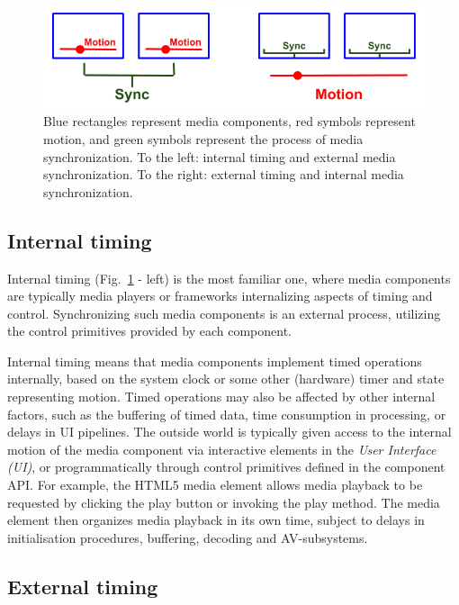 \documentclass[graybox]{svmult}
\begin{document}
\begin{figure}[h]
\centering
\includegraphics[scale=.4]{fig/internal-external.png}
\caption{
  Blue rectangles represent media components, red symbols represent motion, and green symbols represent the process of media synchronization. To the left: internal timing and external media synchronization. To the right: external timing and internal media synchronization.
}
\label{fig:internalexternal}
\end{figure}


\subsection{Internal timing}

Internal timing (Fig.~\ref{fig:internalexternal} - left) is the most
familiar one, where media components are typically media players or frameworks
internalizing aspects of timing and control. Synchronizing such media
components is an external process, utilizing the control primitives provided
by each component.

Internal timing means that media components implement timed operations
internally, based on the system clock or some other (hardware) timer and state
representing motion. Timed operations may also be affected by other internal
factors, such as the buffering of timed data, time consumption in processing,
or delays in UI pipelines. The outside world is typically given access to the
internal motion of the media component via interactive elements in the \emph{User Interface (UI)}, or
programmatically through control primitives defined in the component API. For
example, the HTML5 media element allows media playback to be requested by
clicking the play button or invoking the play method. The media element then
organizes media playback in its own time, subject to delays in initialisation
procedures, buffering, decoding and AV-subsystems.

\subsection {External timing}
\end{document}
